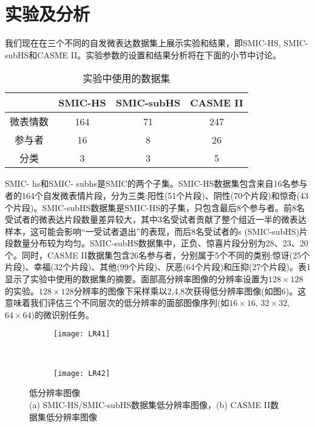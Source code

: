 \section{实验及分析}

我们现在在三个不同的自发微表达数据集上展示实验和结果，即SMIC-HS, SMIC-subHS和CASME II。实验参数的设置和结果分析将在下面的小节中讨论。

\begin{table}[!htbp]
\centering
\caption{实验中使用的数据集}
\label{tab4}
\begin{tabular}{c|ccc}
\hline
 & SMIC-HS & SMIC-subHS & CASME II \\ \hline
微表情数 & 164 & 71 & 247 \\
参与者 & 16 & 8 & 26 \\
分类 & 3 & 3 & 5 \\ \hline
\end{tabular}
\end{table}

SMIC- hs和SMIC- subhs是SMIC的两个子集。SMIC-HS数据集包含来自16名参与者的164个自发微表情片段，分为三类:阳性(51个片段)、阴性(70个片段)和惊奇(43个片段)。SMIC-subHS数据集是SMIC-HS的子集，只包含最后8个参与者。前8名受试者的微表达片段数量差异较大，其中3名受试者贡献了整个组近一半的微表达样本，这可能会影响“一受试者退出”的表现，而后8名受试者的s (SMIC-subHS)片段数量分布较为均匀。SMIC-subHS数据集中，正负、惊喜片段分别为28、23、20个。同时，CASME II数据集包含26名参与者，分别属于5个不同的类别:惊讶(25个片段)、幸福(32个片段)、其他(99个片段)、厌恶(64个片段)和压抑(27个片段)。表1显示了实验中使用的数据集的摘要。面部高分辨率图像的分辨率设置为$ 128 \times 128 $的实验。$ 128 \times 128 $分辨率的图像下采样乘以2,4,8次获得低分辨率图像(如图6)。这意味着我们评估三个不同层次的低分辨率的面部图像序列(如$ 16 \times 16 $, $ 32 \times 32 $, $ 64 \times 64 $)的微识别任务。

\begin{figure}[!htbp]
    \centering
    \begin{subfigure}[b]{0.35\textwidth}
      \texttt{[image: LR41]}
      \caption{}
    \end{subfigure}%
    ~ ~%
    \begin{subfigure}[b]{0.35\textwidth}
      \texttt{[image: LR42]}
      \caption{}
    \end{subfigure}
    \caption{低分辨率图像\\ \footnotesize \textmd{(a) SMIC-HS/SMIC-subHS数据集低分辨率图像，(b) CASME II数据集低分辨率图像}}
    \label{fig14}
\end{figure}

